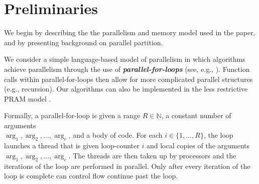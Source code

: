 \documentclass[11pt]{article}
\newcommand{\defn}[1]{{\textit{\textbf{\boldmath #1}}}}
\renewcommand{\paragraph}[1]{\vspace{0.09in}\noindent{\bf \boldmath #1.}}
\theoremstyle{remark}
\theoremstyle{remark}
\begin{document}




\section{Preliminaries}\label{secprelim}

We begin by describing the the parallelism and memory model used in the paper,
and by presenting background on parallel partition.

\paragraph{Workflow Model} We consider a simple language-based model of
parallelism in which algorithms achieve parallelism through the use of
\defn{parallel-for-loops} (see, e.g.,
\cite{Blelloch96,AcarBl16,CLRS}).  Function calls within
parallel-for-loops then allow for more complicated parallel structures
(e.g., recursion). Our algorithms can also be implemented in the less
restrictive PRAM model \cite{Blelloch96, AcarBl16}.

Formally, a parallel-for-loop is given a range $R \in \mathbb{N}$, a constant
number of arguments \\$\arg_1, \arg_2, \ldots, \arg_c$, and a body of code. For
each $i \in \{1, \ldots, R\}$, the loop launches a thread that is given
loop-counter $i$ and local copies of the arguments $\arg_1, \arg_2, \ldots,
\arg_c$. The threads are then taken up by processors and the iterations of the
loop are performed in parallel. Only after every iteration of the loop is
complete can control flow continue past the loop.
\end{document}
